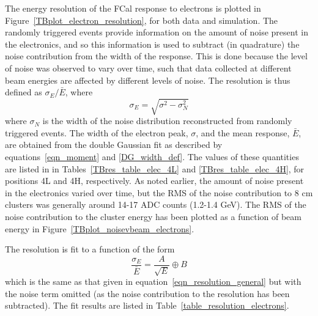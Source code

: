The energy resolution of the FCal response to electrons is plotted in Figure~\ref{TBplot_electron_resolution}, for both data and simulation. The randomly triggered events provide information on the amount of noise present in the electronics, and so this information is used to subtract (in quadrature) the noise contribution from the width of the response. This is done because the level of noise was observed to vary over time, such that data collected at different beam energies are affected by different levels of noise. The resolution is thus defined as $\sigma_E/\bar{E}$, where
\begin{equation}
\sigma_E = \sqrt{\sigma^2 - \sigma_N^2}
\end{equation}
where $\sigma_N$ is the width of the noise distribution reconstructed from randomly triggered events. The width of the electron peak, $\sigma$, and the mean response, $\bar{E}$, are obtained from the double Gaussian fit as described by equations~\ref{eqn_moment} and \ref{DG_width_def}. The values of these quantities are listed in in Tables~\ref{TBres_table_elec_4L} and \ref{TBres_table_elec_4H}, for positions 4L and 4H, respectively. As noted earlier, the amount of noise present in the electronics varied over time, but the RMS of the noise contribution to 8 cm clusters was generally around 14-17 ADC counts (1.2-1.4 GeV). The RMS of the noise contribution to the cluster energy has been plotted as a function of beam energy in Figure~\ref{TBplot_noisevbeam_electrons}.


The resolution is fit to a function of the form
\begin{equation}
\frac{\sigma_E}{\bar{E}} = \frac{A}{\sqrt{E}} \oplus B
\label{resolution_fit_equation}
\end{equation}
which is the same as that given in equation~\ref{eqn_resolution_general} but with the noise term omitted (as the noise contribution to the resolution has been subtracted). The fit results are listed in Table~\ref{table_resolution_electrons}.

%


